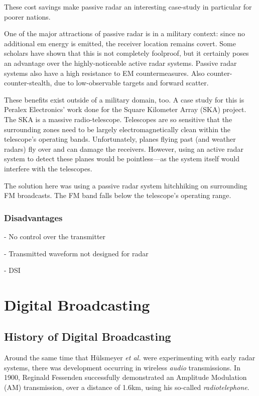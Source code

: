 \documentclass[class=report,11pt,crop=false]{standalone}
\begin{document}
These cost savings make passive radar an interesting case-study in particular for poorer nations. 

One of the major attractions of passive radar is in a military context: since no additional \gls{em} energy is emitted, the receiver location remains covert. Some scholars have shown that this is not completely foolproof, but it certainly poses an advantage over the highly-noticeable active radar systems. Passive radar systems also have a high resistance to EM countermeasures. Also counter-counter-stealth, due to low-observable targets and forward scatter.

\cite{o2009passive}

These benefits exist outside of a military domain, too. A case study for this is Peralex Electronics' work done for the Square Kilometer Array (SKA) project. The SKA is a massive radio-telescope. Telescopes are so sensitive that the surrounding zones need to be largely electromagnetically clean within the telescope's operating bands. Unfortunately, planes flying past (and weather radars) fly over and can damage the receivers. However, using an active radar system to detect these planes would be pointless---as the system itself would interfere with the telescopes.

The solution here was using a passive radar system hitchhiking on surrounding FM broadcasts. The FM band falls below the telescope's operating range.

\subsubsection{Disadvantages}

- No control over the transmitter

- Transmitted waveform not designed for radar

- DSI

\section{Digital Broadcasting}
\subsection{History of Digital Broadcasting}
Around the same time that H\"ulsmeyer \emph{et al.} were experimenting with early radar systems, there was development occurring in wireless \emph{audio} transmissions. In 1900, Reginald Fessenden successfully demonstrated an Amplitude Modulation (AM) transmission, over a distance of 1.6km, using his so-called \emph{radiotelephone}. 
\end{document}
